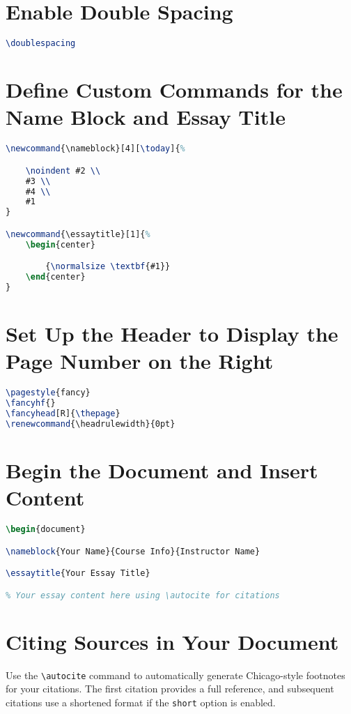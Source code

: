 \documentclass{article}
\begin{document}
\section{Enable Double Spacing}
\begin{lstlisting}[language=TeX]
\doublespacing
\end{lstlisting}

\section{Define Custom Commands for the Name Block and Essay Title}
\begin{lstlisting}[language=TeX]
\newcommand{\nameblock}[4][\today]{%

    \noindent #2 \\
    #3 \\
    #4 \\
    #1
}

\newcommand{\essaytitle}[1]{%
    \begin{center}

        {\normalsize \textbf{#1}}
    \end{center}
}
\end{lstlisting}

\section{Set Up the Header to Display the Page Number on the Right}
\begin{lstlisting}[language=TeX]
\pagestyle{fancy}
\fancyhf{}
\fancyhead[R]{\thepage}
\renewcommand{\headrulewidth}{0pt}
\end{lstlisting}

\section{Begin the Document and Insert Content}
\begin{lstlisting}[language=TeX]
\begin{document}

\nameblock{Your Name}{Course Info}{Instructor Name}

\essaytitle{Your Essay Title}

% Your essay content here using \autocite for citations
\end{lstlisting}

\section{Citing Sources in Your Document}
Use the \texttt{\textbackslash autocite} command to automatically generate Chicago-style footnotes for your citations.
The first citation provides a full reference, and subsequent citations use a shortened format if the \texttt{short} option is enabled.
\end{document}
